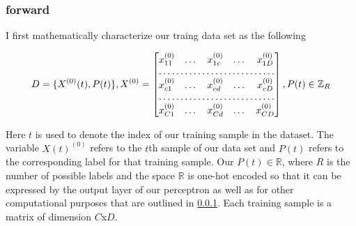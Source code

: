 \documentclass{article}
\begin{document}
\subsubsection{forward}
I first mathematically characterize our traing data set as the following

\begin{equation}\label{eq:1}
D = \{X^{(0)}(t), P(t)\},
X^{(0)}=  \begin{bmatrix}
x^{(0)}_{11}  & \dots & x^{(0)}_{1c}& \dots& x^{(0)}_{1D} \\
\hdotsfor{5} \\
x^{(0)}_{c1}        & \dots& x^{(0)}_{cd} & \dots& x^{(0)}_{cD}\\
\hdotsfor{5}\\
x^{(0)}_{C1}        & \dots & x^{(0)}_{Cd}& \dots &x^{(0)}_{CD}
\end{bmatrix},P(t) \in \mathbb{Z}_{R} 
\end{equation}

Here $t$ is used to denote the index of our training sample in the dataset. The variable $X(t)^{(0)}$ refers to the $t$th sample of our data set and $P(t)$ refers to the corresponding label for that training sample. Our $P(t) \in \mathbb{R}$, where $R$ is the number of possible labels and the space $\mathbb{R}$ is one-hot encoded so that it can be expressed by the output layer of our perceptron as well as for other computational purposes that are outlined in \ref{}. Each training sample is a matrix of dimension $C$x$D$. 
\end{document}
